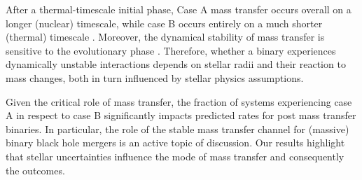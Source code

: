\documentclass[twocolumn]{aastex631}
\begin{document}
After a thermal-timescale initial phase, Case A mass transfer occurs
overall on a longer (nuclear) timescale, while case B occurs entirely
on a much shorter (thermal) timescale \citep[but see][]{klencki:22}.
Moreover, the dynamical stability of mass transfer is sensitive to the
evolutionary phase \citep[e.g.,][]{claeys:14}. Therefore, whether a
binary experiences dynamically unstable interactions depends on
stellar radii and their reaction to mass changes, both in turn
influenced by stellar physics assumptions.

Given the critical role of mass transfer, the fraction of systems
experiencing case A in respect to case B significantly impacts
predicted rates for post mass transfer binaries. In particular, the
role of the stable mass transfer channel \citep[e.g.,][]{marchant:21,
  vanson:22} for (massive) binary black hole mergers is an active
topic of discussion. Our results highlight that stellar uncertainties
influence the mode of mass transfer and consequently the outcomes.




\end{document}
